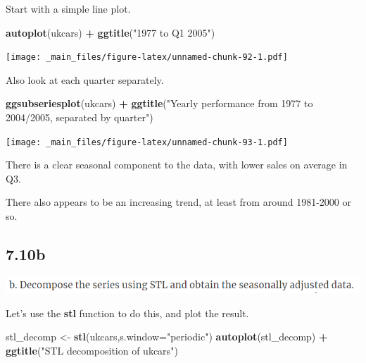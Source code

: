\documentclass[]{book}
\newenvironment{Shaded}{\begin{snugshade}}{\end{snugshade}}
\newcommand{\DataTypeTok}[1]{\textcolor[rgb]{0.13,0.29,0.53}{#1}}
\newcommand{\KeywordTok}[1]{\textcolor[rgb]{0.13,0.29,0.53}{\textbf{#1}}}
\newcommand{\NormalTok}[1]{#1}
\newcommand{\OperatorTok}[1]{\textcolor[rgb]{0.81,0.36,0.00}{\textbf{#1}}}
\newcommand{\StringTok}[1]{\textcolor[rgb]{0.31,0.60,0.02}{#1}}
\begin{document}
Start with a simple line plot.

\begin{Shaded}
\begin{Highlighting}[]
\KeywordTok{autoplot}\NormalTok{(ukcars) }\OperatorTok{+}\StringTok{ }\KeywordTok{ggtitle}\NormalTok{(}\StringTok{"1977 to Q1 2005"}\NormalTok{)}
\end{Highlighting}
\end{Shaded}

\texttt{[image: \_main\_files/figure-latex/unnamed-chunk-92-1.pdf]}

Also look at each quarter separately.

\begin{Shaded}
\begin{Highlighting}[]
\KeywordTok{ggsubseriesplot}\NormalTok{(ukcars) }\OperatorTok{+}\StringTok{ }\KeywordTok{ggtitle}\NormalTok{(}\StringTok{"Yearly performance from 1977 to 2004/2005, separated by quarter"}\NormalTok{)}
\end{Highlighting}
\end{Shaded}

\texttt{[image: \_main\_files/figure-latex/unnamed-chunk-93-1.pdf]}

There is a clear seasonal component to the data, with lower sales on average in Q3.

There also appears to be an increasing trend, at least from around 1981-2000 or so.

\hypertarget{b-6}{%
\subsection{7.10b}\label{b-6}}

\includegraphics{./week4/7.10b.png}

Let's use the \textbf{stl} function to do this, and plot the result.

\begin{Shaded}
\begin{Highlighting}[]
\NormalTok{stl_decomp <-}\StringTok{ }\KeywordTok{stl}\NormalTok{(ukcars,}\DataTypeTok{s.window=}\StringTok{"periodic"}\NormalTok{)}
\KeywordTok{autoplot}\NormalTok{(stl_decomp) }\OperatorTok{+}\StringTok{ }\KeywordTok{ggtitle}\NormalTok{(}\StringTok{"STL decomposition of ukcars"}\NormalTok{)}
\end{Highlighting}
\end{Shaded}
\end{document}
